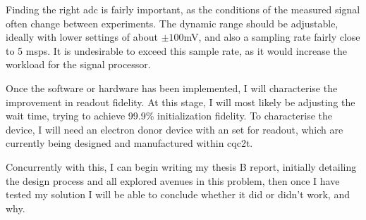 Finding the right \gls{adc} is fairly important, as the conditions of the measured signal often change between experiments. The dynamic range should be adjustable, ideally with lower settings of about $\pm 100$mV, and also a sampling rate fairly close to 5 \gls{msps}. It is undesirable to exceed this sample rate, as it would increase the workload for the signal processor.

Once the software or hardware has been implemented, I will characterise the improvement in readout fidelity. At this stage, I will most likely be adjusting the wait time, trying to achieve 99.9\% initialization fidelity. To characterise the device, I will need an electron donor device with an \gls{set} for readout, which are currently being designed and manufactured within \gls{cqc2t}.

Concurrently with this, I can begin writing my thesis B report, initially detailing the design process and all explored avenues in this problem, then once I have tested my solution I will be able to conclude whether it did or didn't work, and why.


